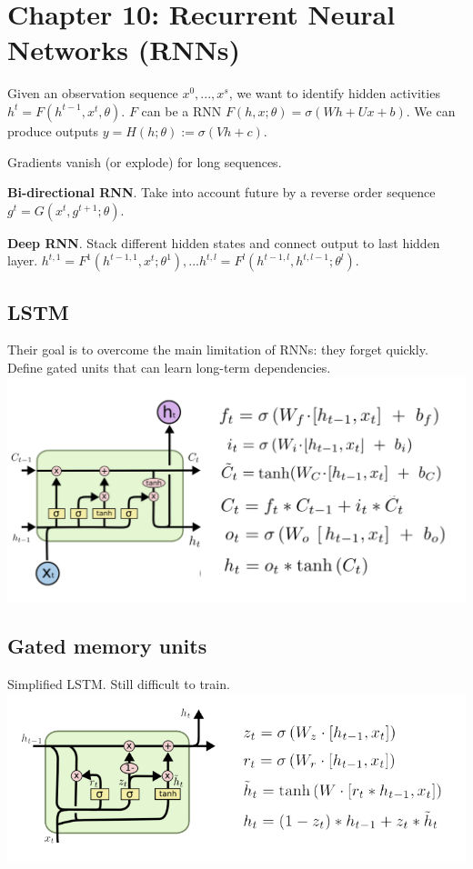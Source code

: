 \section*{Chapter 10: Recurrent Neural Networks (RNNs)}
Given an observation sequence $x^0, ..., x^s$, we want to identify hidden activities $h^t = F(h^{t-1}, x^t, \theta)$. $F$ can be a RNN $F(h, x; \theta) = \sigma(Wh + Ux + b)$. We can produce outputs $y = H(h; \theta) := \sigma(Vh + c)$.

Gradients vanish (or explode) for long sequences.

\textbf{Bi-directional RNN}. Take into account future by a reverse order sequence $g^t = G(x^t, g^{t+1}; \theta)$.

\textbf{Deep RNN}. Stack different hidden states and connect output to last hidden layer. $h^{t,1} = F^1(h^{t-1, 1}, x^t; \theta^1), ... h^{t,l} = F^l(h^{t-1, l}, h^{t, l-1}; \theta^l)$.

\subsection*{LSTM}
Their goal is to overcome the main limitation of RNNs: they forget quickly. Define gated units that can learn long-term dependencies.
\includegraphics[width=\columnwidth]{src/lstm.jpg}
\subsection*{Gated memory units}
Simplified LSTM. Still difficult to train.
\includegraphics[width=\columnwidth]{src/gated-memory-units.png}

